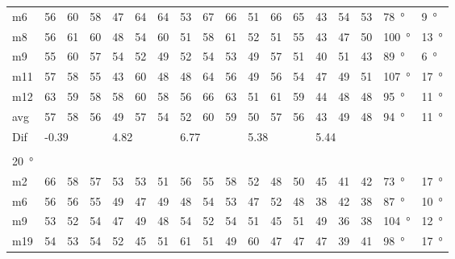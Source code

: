 \begin{table}[H]
\begin{tabular}{l|l|l|l|l|l|l|l|l|l|l|l|l|l|l|l|l|l}
m6    & 56     &  60    &  58    &  47    &  64    &  64    & 53     &  67     &   66   &    51   &    66  &   65   & 43 & 54 &53  & \SI{78}{\degree} & \SI{9}{\degree} \\ 
m8    & 56     &  61    & 60     & 48     &  54    & 60     & 51     & 58      &    61  &    52   &   51   &   55   & 43 & 47 & 50 & \SI{100}{\degree} & \SI{13}{\degree}  \\ 
m9    &  55    & 60     &  57    & 54     &   52   &  49    & 52     &  54     &   53   &     49  &    57  &   51   & 40 & 51 & 43 &  \SI{89}{\degree} & \SI{6}{\degree} \\ 
m11  &  57    & 58     &  55    &  43    &   60   &  48    & 48     &   64    &    56  &     49  &    56  &    54  & 47 & 49 & 51 &  \SI{107}{\degree} & \SI{17}{\degree} \\ 
m12  &  63    & 59     &  58    &  58    &  60    & 58     & 56     &   66    &    63  &    51   &    61  &  59    & 44 & 48 & 48&  \SI{95}{\degree} & \SI{11}{\degree} \\ \hline
avg &  57    & 58     &  56    &   49   &  57    & 54     &  52    &  60     & 59     &   50    &  57    &  56    & 43 & 49  & 48   &\SI{94}{\degree} & \SI{11}{\degree} \\ \hline  
Dif & \multicolumn{3}{l|}{-0.39} & \multicolumn{3}{l|}{4.82} & \multicolumn{3}{l|}{6.77} & \multicolumn{3}{l|}{5.38} &  \multicolumn{3}{l|}{5.44} &  \multicolumn{2}{l}{}  \\ 
 \multicolumn{18}{l}{ } \\                             
\SI{20}{\degree}   & \multicolumn{3}{l|}{} & \multicolumn{3}{l|}{} & \multicolumn{3}{l|}{} & \multicolumn{3}{l|}{} &  \multicolumn{3}{l|}{}  &  \multicolumn{2}{l}{}  \\  \hline
m2    & 66     &  58    &  57    &  53    &  53    &  51    &  56    &   55    &  58    &  52     &  48    &  50    & 45 & 41 & 42 &  \SI{73}{\degree} & \SI{17}{\degree} \\
m6    & 56     &  56    &  55    & 49     &  47    &  49    &   48   &   54    &   53   &   47    &  52    &  48    & 38 & 42 & 38 &  \SI{87}{\degree} & \SI{10}{\degree} \\
m9    &  53    &  52    & 54     &  47    &   49   &   48   &   54   &   52    &  54    &   51    &  45   &  51    & 49 & 36 & 38 & \SI{104}{\degree} & \SI{12}{\degree} \\
m19  &    54  &  53    &  54    &  52    &  45    &    51  &   61   &   51    &   49   &   60    &  47   &   47   & 47 & 39 & 41 & \SI{98}{\degree} & \SI{17}{\degree} \\

\end{tabular}
\end{table}
